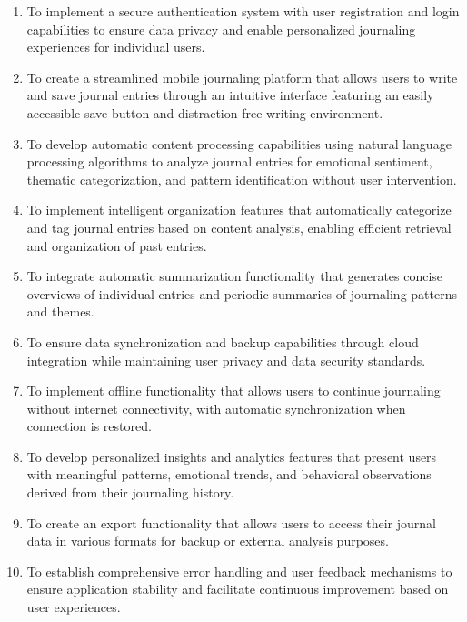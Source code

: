\begin{enumerate}
	\item To implement a secure authentication system with user registration and login capabilities to ensure data privacy and enable personalized journaling experiences for individual users.
	
	\item To create a streamlined mobile journaling platform that allows users to write and save journal entries through an intuitive interface featuring an easily accessible save button and distraction-free writing environment.
	
	\item To develop automatic content processing capabilities using natural language processing algorithms to analyze journal entries for emotional sentiment, thematic categorization, and pattern identification without user intervention.
	
	\item To implement intelligent organization features that automatically categorize and tag journal entries based on content analysis, enabling efficient retrieval and organization of past entries.
	
	\item To integrate automatic summarization functionality that generates concise overviews of individual entries and periodic summaries of journaling patterns and themes.
	
	\item To ensure data synchronization and backup capabilities through cloud integration while maintaining user privacy and data security standards.
	
	\item To implement offline functionality that allows users to continue journaling without internet connectivity, with automatic synchronization when connection is restored.
	
	\item To develop personalized insights and analytics features that present users with meaningful patterns, emotional trends, and behavioral observations derived from their journaling history.
	
	\item To create an export functionality that allows users to access their journal data in various formats for backup or external analysis purposes.
	
	\item To establish comprehensive error handling and user feedback mechanisms to ensure application stability and facilitate continuous improvement based on user experiences.
\end{enumerate}


